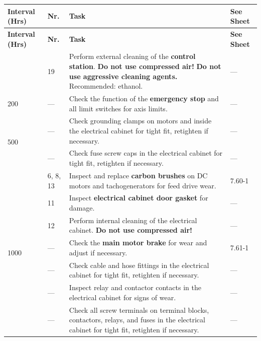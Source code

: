
\renewcommand{\arraystretch}{1.3}
\begin{longtable}{|p{1.8cm}|p{1.2cm}|p{8.5cm}|p{2cm}|}
    \hline
    \textbf{Interval (Hrs)} & \textbf{Nr.} & \textbf{Task} & \textbf{See Sheet} \\
    \hline
    \endfirsthead

    \hline
    \textbf{Interval (Hrs)} & \textbf{Nr.} & \textbf{Task} & \textbf{See Sheet} \\
    \hline
    \endhead

    \hline
    \endfoot

    \multirow{1}{*}{8} & 19 & Perform external cleaning of the \textbf{control station}.  
    \textbf{Do not use compressed air!}  
    \textbf{Do not use aggressive cleaning agents.} Recommended: ethanol. & --- \\
    \hline

    \multirow{1}{*}{200} & --- & Check the function of the \textbf{emergency stop} and all limit switches for axis limits. & --- \\
    \hline

    \multirow{2}{*}{500} & --- & Check grounding clamps on motors and inside the electrical cabinet for tight fit, retighten if necessary. & --- \\
    \cline{2-4}
    & --- & Check fuse screw caps in the electrical cabinet for tight fit, retighten if necessary. & --- \\
    \hline

    \multirow{7}{*}{1000} & 6, 8, 13 & Inspect and replace \textbf{carbon brushes} on DC motors and tachogenerators for feed drive wear. & 7.60-1 \\
    \cline{2-4}
    & 11 & Inspect \textbf{electrical cabinet door gasket} for damage. & --- \\
    \cline{2-4}
    & 12 & Perform internal cleaning of the electrical cabinet.  
    \textbf{Do not use compressed air!} & --- \\
    \cline{2-4}
    & --- & Check the \textbf{main motor brake} for wear and adjust if necessary. & 7.61-1 \\
    \cline{2-4}
    & --- & Check cable and hose fittings in the electrical cabinet for tight fit, retighten if necessary. & --- \\
    \cline{2-4}
    & --- & Inspect relay and contactor contacts in the electrical cabinet for signs of wear. & --- \\
    \cline{2-4}
    & --- & Check all screw terminals on terminal blocks, contactors, relays, and fuses in the electrical cabinet for tight fit, retighten if necessary. & --- \\
    \hline
\end{longtable}

